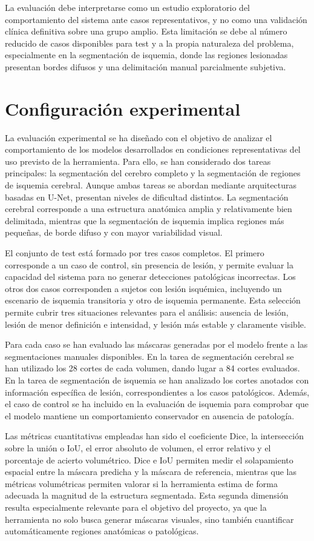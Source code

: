 La evaluación debe interpretarse como un estudio exploratorio del comportamiento del sistema ante casos representativos, y no como una validación clínica definitiva sobre una grupo amplio. Esta limitación se debe al número reducido de casos disponibles para test y a la propia naturaleza del problema, especialmente en la segmentación de isquemia, donde las regiones lesionadas presentan bordes difusos y una delimitación manual parcialmente subjetiva.

\section{Configuración experimental}
La evaluación experimental se ha diseñado con el objetivo de analizar el comportamiento de los modelos desarrollados en condiciones representativas del uso previsto de la herramienta. Para ello, se han considerado dos tareas principales: la segmentación del cerebro completo y la segmentación de regiones de isquemia cerebral. Aunque ambas tareas se abordan mediante arquitecturas basadas en U-Net, presentan niveles de dificultad distintos. La segmentación cerebral corresponde a una estructura anatómica amplia y relativamente bien delimitada, mientras que la segmentación de isquemia implica regiones más pequeñas, de borde difuso y con mayor variabilidad visual.

El conjunto de test está formado por tres casos completos. El primero corresponde a un caso de control, sin presencia de lesión, y permite evaluar la capacidad del sistema para no generar detecciones patológicas incorrectas. Los otros dos casos corresponden a sujetos con lesión isquémica, incluyendo un escenario de isquemia transitoria y otro de isquemia permanente. Esta selección permite cubrir tres situaciones relevantes para el análisis: ausencia de lesión, lesión de menor definición e intensidad, y lesión más estable y claramente visible.

Para cada caso se han evaluado las máscaras generadas por el modelo frente a las segmentaciones manuales disponibles. En la tarea de segmentación cerebral se han utilizado los 28 cortes de cada volumen, dando lugar a 84 cortes evaluados. En la tarea de segmentación de isquemia se han analizado los cortes anotados con información específica de lesión, correspondientes a los casos patológicos. Además, el caso de control se ha incluido en la evaluación de isquemia para comprobar que el modelo mantiene un comportamiento conservador en ausencia de patología.

Las métricas cuantitativas empleadas han sido el coeficiente Dice, la intersección sobre la unión o IoU, el error absoluto de volumen, el error relativo y el porcentaje de acierto volumétrico. Dice e IoU permiten medir el solapamiento espacial entre la máscara predicha y la máscara de referencia, mientras que las métricas volumétricas permiten valorar si la herramienta estima de forma adecuada la magnitud de la estructura segmentada. Esta segunda dimensión resulta especialmente relevante para el objetivo del proyecto, ya que la herramienta no solo busca generar máscaras visuales, sino también cuantificar automáticamente regiones anatómicas o patológicas.

